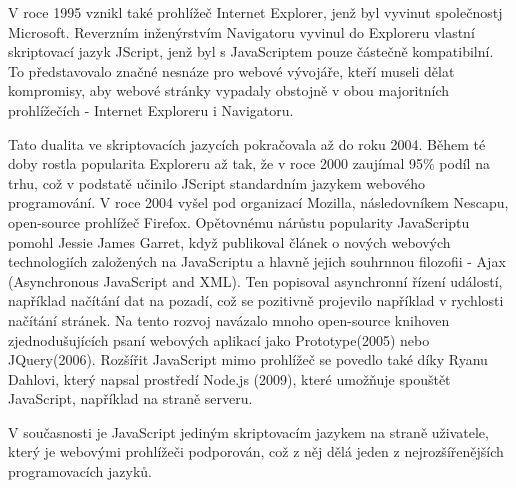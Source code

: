 \documentclass[main.tex]{subfiles}
\begin{document}
V roce 1995 vznikl také prohlížeč Internet Explorer, jenž byl vyvinut společnostj Microsoft. Reverzním inženýrstvím Navigatoru vyvinul do Exploreru vlastní skriptovací jazyk JScript, jenž byl s JavaScriptem pouze částečně kompatibilní. To představovalo značné nesnáze pro webové vývojáře, kteří museli dělat kompromisy, aby webové stránky vypadaly obstojně v obou majoritních prohlížečích - Internet Exploreru i Navigatoru. 

Tato dualita ve skriptovacích jazycích pokračovala až do roku 2004. Během té doby rostla popularita Exploreru až tak, že v roce 2000 zaujímal 95\% podíl na trhu, což v podstatě učinilo JScript standardním jazykem webového programování. V roce 2004 vyšel pod organizací Mozilla, následovníkem Nescapu, open-source prohlížeč Firefox. 
Opětovnému nárůstu popularity JavaScriptu pomohl Jessie James Garret, když publikoval článek o nových webových technologiích založených na JavaScriptu a hlavně jejich souhrnnou filozofii - Ajax (Asynchronous JavaScript and XML). Ten popisoval asynchronní řízení událostí, například načítání dat na pozadí, což se pozitivně projevilo například v rychlosti načítání stránek. Na tento rozvoj navázalo mnoho open-source knihoven zjednodušujících psaní webových aplikací jako Prototype(2005) nebo JQuery(2006).
Rozšířit JavaScript mimo prohlížeč se povedlo také díky Ryanu Dahlovi, který napsal prostředí Node.js (2009), které umožňuje spouštět JavaScript, například na straně serveru.

V současnosti je JavaScript jediným skriptovacím jazykem na straně uživatele, který je webovými prohlížeči podporován, což z něj dělá jeden z nejrozšířenějších programovacích jazyků.

\end{document}
